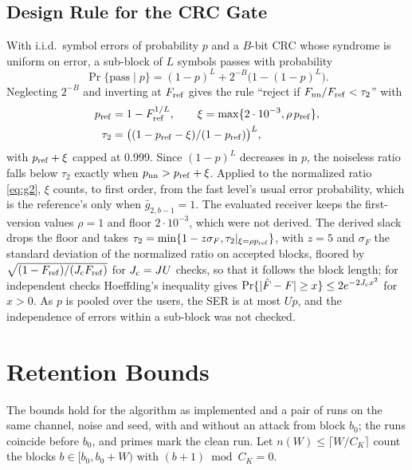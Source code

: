 \documentclass[journal]{IEEEtran}
\theoremstyle{remark}
\begin{document}
\subsection{Design Rule for the CRC Gate}\label{sec:crcrule}
With i.i.d.\ symbol errors of probability $p$ and a $B$-bit CRC whose syndrome is uniform on error, a
sub-block of $L$ symbols passes with probability
\begin{equation}\label{eq:pass}
\Pr\{\mathrm{pass}\mid p\}=(1-p)^L+2^{-B}\big(1-(1-p)^L\big).
\end{equation}
Neglecting $2^{-B}$ and inverting at $F_{\rm ref}$ gives the rule ``reject if
$F_{\rm nn}/F_{\rm ref}<\tau_2$'' with
\begin{equation}\label{eq:tau2}
\begin{aligned}
p_{\rm ref}&=1-F_{\rm ref}^{1/L},\qquad \xi=\max\{2\cdot10^{-3},\rho\,p_{\rm ref}\},\\
\tau_2&=\big((1-p_{\rm ref}-\xi)/(1-p_{\rm ref})\big)^{L},
\end{aligned}
\end{equation}
with $p_{\rm ref}+\xi$ capped at 0.999. Since $(1-p)^L$ decreases in $p$, the noiseless ratio falls below
$\tau_2$ exactly when $p_{\rm nn}>p_{\rm ref}+\xi$. Applied to the normalized ratio \eqref{eq:g2}, $\xi$
counts, to first order, from the fast level's usual error probability, which is the reference's only
when $\bar g_{2,b-1}=1$. The evaluated receiver keeps the first-version values $\rho=1$ and floor
$2\cdot10^{-3}$, which were not derived. The derived slack drops the floor and takes
$\tau_2=\min\{1-z\sigma_F,\tau_2|_{\xi=\rho p_{\rm ref}}\}$, with $z=5$ and $\sigma_F$ the standard
deviation of the normalized ratio on accepted blocks, floored by $\sqrt{(1-F_{\rm ref})/(J_{\rm c}F_{\rm ref})}$
for $J_{\rm c}=JU$ checks, so that it follows the block length; for independent checks Hoeffding's
inequality \cite{hoeffding1963} gives $\Pr\{|\hat F-F|\ge x\}\le2e^{-2J_{\rm c}x^2}$ for $x>0$.
As $p$ is pooled over the users, the SER is at most $Up$, and the independence of errors within
a sub-block was not checked.
\section{Retention Bounds}\label{sec:theory}
The bounds hold for the algorithm as implemented and a pair of runs on the same channel, noise and seed,
with and without an attack from block $b_0$; the runs coincide before $b_0$, and primes mark the clean
run. Let $n(W)\le\lceil W/C_K\rceil$ count the blocks $b\in[b_0,b_0+W)$ with $(b+1)\bmod C_K=0$.
\end{document}
